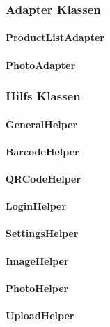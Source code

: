 \documentclass{scrartcl}
\begin{document}
\subsubsection{Adapter Klassen}

\paragraph{ProductListAdapter}

\paragraph{PhotoAdapter}

\subsubsection{Hilfs Klassen}

\paragraph{GeneralHelper}

\paragraph{BarcodeHelper}

\paragraph{QRCodeHelper}

\paragraph{LoginHelper}

\paragraph{SettingsHelper}

\paragraph{ImageHelper}

\paragraph{PhotoHelper}

\paragraph{UploadHelper}
\end{document}
